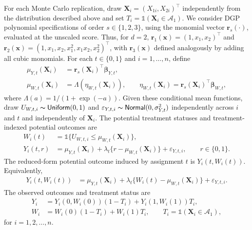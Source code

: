 \documentclass[10pt]{article}
\newcommand{\Indicator}{\mathds{1}}
\newcommand{\br}{\mathbf{r}}
\newcommand{\bx}{\mathbf{x}}
\newcommand{\bX}{\mathbf{X}}
\newcommand{\bbeta}{\boldsymbol{\beta}}
\newcommand{\A}{\mathcal{A}}
\begin{document}
For each Monte Carlo replication, draw $\bX_i=(X_{1i},X_{2i})^\top$ independently from the distribution described above and set $T_i=\Indicator(\bX_i\in\A_1)$. We consider DGP polynomial specifications of order $s\in\{1,2,3\}$, using the monomial vector $\br_s(\cdot)$, evaluated at the unscaled score. Thus, for $d=2$, $\br_1(\bx)=(1,x_1,x_2)^\top$ and $\br_2(\bx)=(1,x_1,x_2,x_1^2,x_1x_2,x_2^2)^\top$, with $\br_3(\bx)$ defined analogously by adding all cubic monomials. For each $t\in\{0,1\}$ and $i=1,\ldots,n$, define
\begin{align*}
    \mu_{Y,t}(\bX_i)
    &= \br_s(\bX_i)^\top\bbeta_{Y,t},\\
    \mu_{W,t}(\bX_i)
    &= \Lambda(\eta_{W,t}(\bX_i)),
    \qquad
    \eta_{W,t}(\bX_i) = \br_s(\bX_i)^\top\bbeta_{W,t},
\end{align*}
where $\Lambda(a)=1/(1+\exp(-a))$. Given these conditional mean functions, draw $U_{W,t,i}\thicksim\mathsf{Uniform}(0,1)$ and $\varepsilon_{Y,t,i}\thicksim\mathsf{Normal}(0,\sigma_{Y,t}^2)$ independently across $i$ and $t$ and independently of $\bX_i$. The potential treatment statuses and treatment-indexed potential outcomes are
\begin{align*}
    W_i(t)
    &= \Indicator\{U_{W,t,i}\leq \mu_{W,t}(\bX_i)\},\\
    Y_i(t,r)
    &= \mu_{Y,t}(\bX_i) + \lambda_t\{r-\mu_{W,t}(\bX_i)\}
    + \varepsilon_{Y,t,i},
    \qquad r\in\{0,1\}.
\end{align*}
The reduced-form potential outcome induced by assignment $t$ is $Y_i(t,W_i(t))$. Equivalently,
\begin{align*}
    Y_i(t,W_i(t))
    &=
    \mu_{Y,t}(\bX_i)
    +\lambda_t\{W_i(t)-\mu_{W,t}(\bX_i)\}
    +\varepsilon_{Y,t,i}.
\end{align*}
The observed outcomes and treatment status are
\begin{align*}
    Y_i &= Y_i(0,W_i(0)) (1-T_i) + Y_i(1,W_i(1)) T_i,\\
    W_i &= W_i(0) (1-T_i) + W_i(1) T_i, \qquad  T_i = \Indicator(\bX_i \in \A_1),
\end{align*}
for $i=1,2,\ldots,n$.
\end{document}

